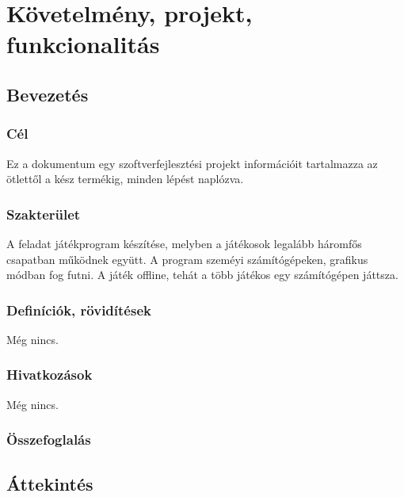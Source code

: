 %
\chapter{Követelmény, projekt, funkcionalitás}

\thispagestyle{fancy}

\section{Bevezetés}

\subsection{Cél}

Ez a dokumentum egy szoftverfejlesztési projekt információit tartalmazza az ötlettől a kész termékig, minden lépést naplózva.

\subsection{Szakterület}

A feladat játékprogram készítése, melyben a játékosok legalább háromfős csapatban működnek együtt. A program szeméyi számítógépeken, grafikus módban fog futni. A játék offline, tehát a több játékos egy számítógépen játtsza.

\subsection{Definíciók, rövidítések}
Még nincs.

\subsection{Hivatkozások}
Még nincs.

\subsection{Összefoglalás}

\section{Áttekintés}
